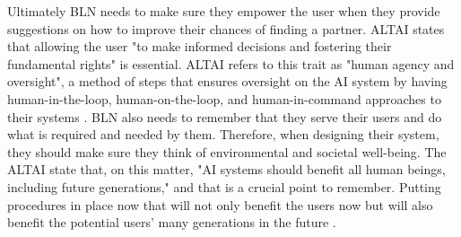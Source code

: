 \documentclass[a4paper,10pt]{article}
\begin{document}
	Ultimately BLN needs to make sure they empower the user when they provide suggestions on how to improve their chances of finding a partner. ALTAI states that allowing the user "to make informed decisions and fostering their fundamental rights" \cite{ALTAI_ws} is essential. ALTAI refers to this trait as "human agency and oversight", a method of steps that ensures oversight on the AI system by having human-in-the-loop, human-on-the-loop, and human-in-command approaches to their systems \cite{ALTAI_ws}. BLN also needs to remember that they serve their users and do what is required and needed by them. Therefore, when designing their system, they should make sure they think of environmental and societal well-being. The ALTAI state that, on this matter, "AI systems should benefit all human beings, including future generations," and that is a crucial point to remember. Putting procedures in place now that will not only benefit the users now but will also benefit the potential users' many generations in the future \cite{ALTAI_ws}. 
	
\medskip
\newpage
	
	

\newpage



\end{document}

